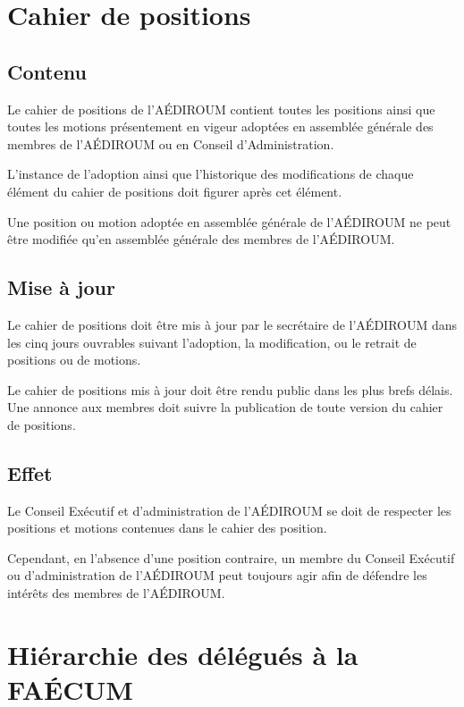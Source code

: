 \documentclass{aediroum}
\begin{document}
\section{Cahier de positions}\label{sec:cahier-de-positions}

\subsection{Contenu}\label{sec:contenu-positions}

Le cahier de positions de l'AÉDIROUM contient toutes les positions ainsi que toutes les motions présentement en vigeur adoptées en assemblée générale des membres de l'AÉDIROUM ou en Conseil d'Administration.

L'instance de l'adoption ainsi que l'historique des modifications de chaque élément du cahier de positions doit figurer après cet élément.

Une position ou motion adoptée en assemblée générale de l'AÉDIROUM ne peut être modifiée qu'en assemblée générale des membres de l'AÉDIROUM.

\subsection{Mise à jour}\label{sec:mise-a-jour-positions}

Le cahier de positions doit être mis à jour par le secrétaire de l'AÉDIROUM dans les cinq jours ouvrables suivant l'adoption, la modification, ou le retrait de positions ou de motions.

Le cahier de positions mis à jour doit être rendu public dans les plus brefs délais. Une annonce aux membres doit suivre la publication de toute version du cahier de positions.

\subsection{Effet}\label{sec:effet-positions}

Le Conseil Exécutif et d'administration de l'AÉDIROUM se doit de respecter les positions et motions contenues dans le cahier des position.

Cependant, en l'absence d'une position contraire, un membre du Conseil Exécutif ou d'administration de l'AÉDIROUM peut toujours agir afin de défendre les intérêts des membres de l'AÉDIROUM.

\section{Hiérarchie des délégués à la FAÉCUM}\label{sec:hierarchie-delegues-faecum}
\end{document}
